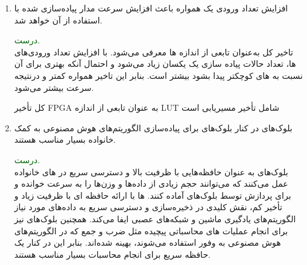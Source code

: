 \begin{enumerate}
\begin{qsolve}
	\end{qsolve}
	
	
	
	\item 
	افزایش تعداد ورودی یک  همواره باعث افزایش سرعت مدار پیاده‌سازی شده با استفاده از آن خواهد شد.
	\begin{qsolve}
		\textcolor{darkgreen}{درست.}\\
		تاخیر کل  به‌عنوان تابعی از اندازه  ها معرفی می‌شود. با افزایش تعداد ورودی‌های  ها، تعداد حالات پیاده سازی یک  یکسان زیاد می‌شود و احتمال آنکه  بهتری برای آن نسبت به  های کوچکتر پیدا بشود بیشتر است. بنابر این تاخیر همواره کمتر و درنتیجه سرعت بیشتر می‌شود.
		
		
		کل تأخیر FPGA به عنوان تابعی از اندازه LUT شامل تأخیر مسیریابی است
	\end{qsolve}
	
	
	
	
	\item 
	بلوک‌های  در کنار بلوک‌های  برای پیاده‌سازی الگوریتم‌های هوش مصنوعی به کمک  خانواده  بسیار مناسب هستند.
	\begin{qsolve}
		\textcolor{darkgreen}{درست.}\\
		بلوک‌های  به عنوان حافظه‌هایی با ظرفیت بالا و دسترسی سریع در  های خانواده  عمل می‌کنند که می‌توانند حجم زیادی از داده‌ها و وزن‌ها را به سرعت خوانده و برای پردازش توسط بلوک‌های  آماده کنند.  ها با ارائه حافظه ای با ظرفیت زیاد و تأخیر کم، نقش کلیدی در ذخیره‌سازی و دسترسی سریع به داده‌های مورد نیاز الگوریتم‌های یادگیری ماشین و شبکه‌های عصبی ایفا می‌کند. همچنین بلوک‌های  نیز برای انجام عملیات های محاسباتی پیچیده مثل ضرب و جمع که در الگوریتم‌های هوش مصنوعی به وفور استفاده می‌شوند، بهینه شده‌اند. بنابر این در کنار یک حافظه سریع برای انجام محاسبات بسیار مناسب هستند.
		
	\end{qsolve}
	
	
\end{enumerate}